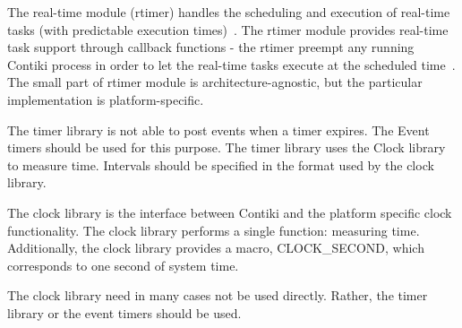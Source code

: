 The real-time module (rtimer) handles the scheduling and execution of
real-time tasks (with predictable execution times)~\cite{contiki-docs}.
The rtimer module provides real-time task support through callback functions -
the rtimer preempt any running Contiki process in order to let the real-time tasks
execute at the scheduled time~\cite{contiki-wiki-timers}.
The small part of rtimer module is architecture-agnostic,
but the particular implementation is platform-specific.



The timer library is not able to post events when a timer expires. The Event timers should be used for this purpose.
The timer library uses the Clock library to measure time. Intervals should be specified in the format used by the clock library.

The clock library is the interface between Contiki and the platform specific clock functionality.
The clock library performs a single function: measuring time.
Additionally, the clock library provides a macro, CLOCK\_SECOND, which corresponds to one second of system time.

The clock library need in many cases not be used directly. Rather, the timer library or the event timers should be used.
